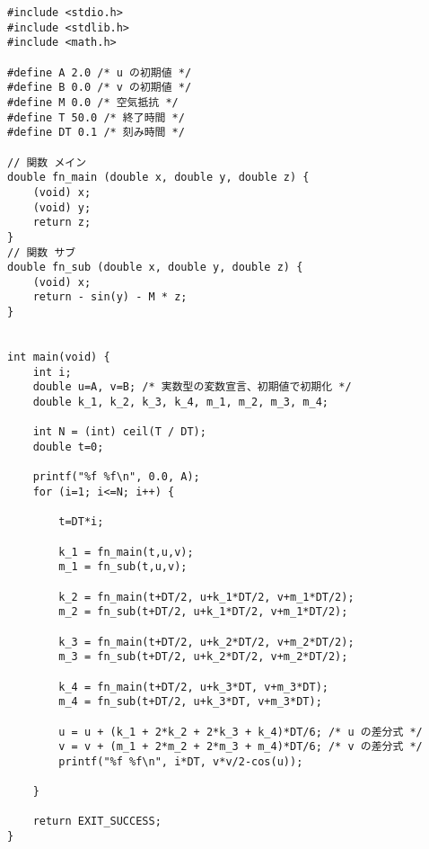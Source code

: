 \documentclass[12pt,b5paper]{ltjsarticle}
\begin{document}
\begin{lstlisting}
#include <stdio.h>
#include <stdlib.h>
#include <math.h>

#define A 2.0 /* u の初期値 */
#define B 0.0 /* v の初期値 */
#define M 0.0 /* 空気抵抗 */
#define T 50.0 /* 終了時間 */
#define DT 0.1 /* 刻み時間 */

// 関数 メイン
double fn_main (double x, double y, double z) {
    (void) x;
    (void) y;
    return z;
}
// 関数 サブ
double fn_sub (double x, double y, double z) {
    (void) x;
    return - sin(y) - M * z;
}


int main(void) {
    int i;
    double u=A, v=B; /* 実数型の変数宣言、初期値で初期化 */
    double k_1, k_2, k_3, k_4, m_1, m_2, m_3, m_4;

    int N = (int) ceil(T / DT);
    double t=0;

    printf("%f %f\n", 0.0, A);
    for (i=1; i<=N; i++) {

        t=DT*i;
        
        k_1 = fn_main(t,u,v);
        m_1 = fn_sub(t,u,v);
        
        k_2 = fn_main(t+DT/2, u+k_1*DT/2, v+m_1*DT/2);
        m_2 = fn_sub(t+DT/2, u+k_1*DT/2, v+m_1*DT/2);
        
        k_3 = fn_main(t+DT/2, u+k_2*DT/2, v+m_2*DT/2);
        m_3 = fn_sub(t+DT/2, u+k_2*DT/2, v+m_2*DT/2);
        
        k_4 = fn_main(t+DT/2, u+k_3*DT, v+m_3*DT);
        m_4 = fn_sub(t+DT/2, u+k_3*DT, v+m_3*DT);
        
        u = u + (k_1 + 2*k_2 + 2*k_3 + k_4)*DT/6; /* u の差分式 */
        v = v + (m_1 + 2*m_2 + 2*m_3 + m_4)*DT/6; /* v の差分式 */
        printf("%f %f\n", i*DT, v*v/2-cos(u));
        
    }
    
    return EXIT_SUCCESS;
}
\end{lstlisting}
\end{document}
